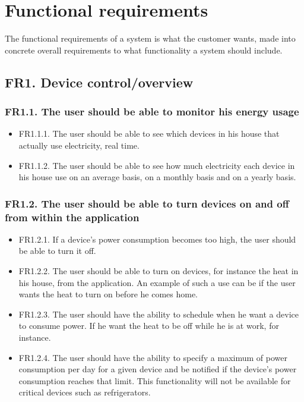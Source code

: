 \section{Functional requirements}
The functional requirements of a system is what the customer wants, made into concrete overall requirements to what functionality a system should include. 

\subsection{FR1. Device control/overview}
\subsubsection{FR1.1. The user should be able to monitor his energy usage}

\begin{itemize}
\item FR1.1.1. The user should be able to see which devices in his house that actually use electricity, real time.
\item FR1.1.2. The user should be able to see how much electricity each device in his house use on an average basis, on a monthly basis and on a yearly basis.
\end{itemize}

\subsubsection{FR1.2. The user should be able to turn devices on and off from within the application}
\begin{itemize}
\item FR1.2.1. If a device's power consumption becomes too high, the user should be able to turn it off.
\item FR1.2.2. The user should be able to turn on devices, for instance the heat in his house, from the application. An example of such a use can be if the user wants the heat to turn on before he comes home.
\item FR1.2.3. The user should have the ability to schedule when he want a device to consume power. If he want the heat to be off while he is at work, for instance. 
\item FR1.2.4. The user should have the ability to specify a maximum of power 
consumption per day for a given device and be notified if the device's power
consumption reaches that limit. This functionality will not be available
for critical devices such as refrigerators. 
\end{itemize}

